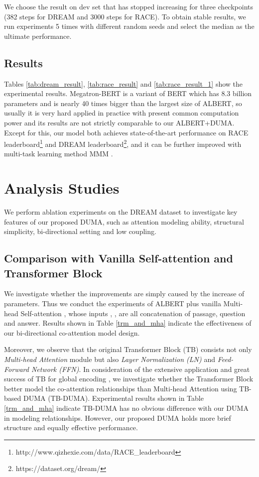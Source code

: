 \documentclass[letterpaper]{article} \usepackage{aaai21}  \usepackage{times}  \usepackage{helvet} \usepackage{courier}  \usepackage[hyphens]{url}  \usepackage{graphicx} \urlstyle{rm} \def\UrlFont{\rm}  \usepackage{natbib}  \usepackage{caption} \frenchspacing  \setlength{\pdfpagewidth}{8.5in}  \setlength{\pdfpageheight}{11in}
\begin{document}
We choose the result on dev set that has stopped increasing for three checkpoints (382 steps for DREAM and 3000 steps for RACE). To obtain stable results, we run experiments 5 times with different random seeds and select the median as the ultimate performance.

\subsection{Results}
Tables \ref{tab:dream_result}, \ref{tab:race_result} and \ref{tab:race_result_1} show the experimental results. Megatron-BERT \cite{Megatron} is a variant of BERT \cite{bert} which has 8.3 billion parameters and is nearly 40 times bigger than the largest size of ALBERT, so usually it is very hard applied in practice with present common computation power and its results are not strictly comparable to our ALBERT+DUMA. Except for this, our model both achieves state-of-the-art performance on RACE leaderboard\footnote{http://www.qizhexie.com/data/RACE\_leaderboard} and DREAM leaderboard\footnote{https://dataset.org/dream/}, and it can be further improved with multi-task learning method MMM \cite{dumamulti, mmm}.

\section{Analysis Studies}\label{ablation_sec}

We perform ablation experiments on the DREAM dataset to investigate key features of our proposed DUMA, such as attention modeling ability, structural simplicity, bi-directional setting and low coupling.

\subsection{Comparison with Vanilla Self-attention and Transformer Block}\label{trm_block}

We investigate whether the improvements are simply caused by the increase of parameters. Thus we conduct the experiments of ALBERT plus vanilla Multi-head Self-attention \cite{transformer}, whose inputs , ,  are all concatenation of passage, question and answer. Results shown in Table \ref{trm_and_mha} indicate the effectiveness of our bi-directional co-attention model design.

Moreover, we observe that the original Transformer Block (TB) \cite{transformer} consists not only \textit{Multi-head Attention} module but also \textit{Layer Normalization (LN)} and \textit{Feed-Forward Network (FFN)}.  In consideration of the extensive application and great success of TB for global encoding \cite{bert,roberta,albert}, we investigate whether the Transformer Block better model the co-attention relationships than Multi-head Attention using TB-based DUMA (TB-DUMA). Experimental results shown in Table \ref{trm_and_mha} indicate TB-DUMA has no obvious difference with our DUMA in modeling relationships. However, our proposed DUMA holds more brief structure and equally effective performance.
\end{document}
